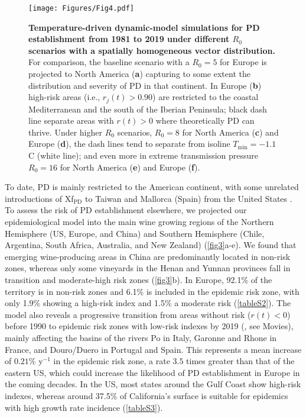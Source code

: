     \begin{figure}[b!]
        \centering
        \texttt{[image: Figures/Fig4.pdf]}
        \caption[Temperature-driven model simulations for PD
            establishment from 1981 to 2019]{\textbf{Temperature-driven
                dynamic-model simulations
                for PD
                establishment from 1981 to 2019 under different $R_0$ scenarios
                with a
                spatially homogeneous vector distribution.} For comparison, the
            baseline
            scenario with a $R_0=5$ for Europe is projected to North America
            (\textbf{a})
            capturing to some extent the distribution and severity of PD in
            that continent.
            In Europe (\textbf{b}) high-risk areas (i.e., $r_j(t) > 0.90$) are
            restricted
            to the coastal Mediterranean and the south of the Iberian
            Peninsula; black dash
            line separate areas with $r(t)>0$ where theoretically PD can
            thrive. Under
            higher $R_0$ scenarios, $R_0=8$ for North America (\textbf{c}) and
            Europe
            (\textbf{d}), the dash lines tend to separate from isoline
            $T_{\textrm{min}} =
                -1.1$\textdegree C (white line); and even more in extreme
            transmission pressure
            $R_0=16$ for North America (\textbf{e}) and Europe (\textbf{f}). }
        \label{fig4}
    \end{figure}

    To date, PD is mainly restricted to the American continent, with some
    unrelated introductions of Xf$_{\textrm{PD}}$ to Taiwan and Mallorca
    (Spain) from the United States \cite{Moralejo2019,Su2013}. To assess the
    risk of PD establishment elsewhere, we projected our epidemiological model
    into the main wine growing regions of the Northern Hemisphere (US, Europe,
    and China) and Southern Hemisphere (Chile, Argentina, South Africa,
    Australia, and New Zealand) (\cref{fig3}a-e). We found that emerging
    wine-producing areas in China are predominantly located in non-risk zones,
    whereas only some vineyards in the Henan and Yunnan provinces fall in
    transition and moderate-high risk zones (\cref{fig3}b). In Europe, 92.1\%
    of the territory is in non-risk zones and 6.1\% is included in the
    epidemic risk zone, with only 1.9\% showing a high-risk index and 1.5\% a
    moderate risk (\cref{tableS2}). The model also reveals a progressive
    transition from areas without risk ($r(t) < 0$) before 1990 to
    epidemic risk zones with low-risk indexes by 2019 (\cite{Webpage}, see
    Movies), mainly affecting the basins of the rivers Po in Italy, Garonne and
    Rhone in France, and Douro/Duero in Portugal and Spain. This represents a
    mean increase of $0.21\%$ y$^{-1}$ in the epidemic risk zone, a rate $3.5$
    times greater than that of the eastern US, which could increase the
    likelihood of PD establishment in Europe in the coming decades. In the US,
    most states around the Gulf Coast show high-risk indexes, whereas around
    37.5\% of California's surface is suitable for epidemics with high growth
    rate incidence (\cref{tableS3}).

